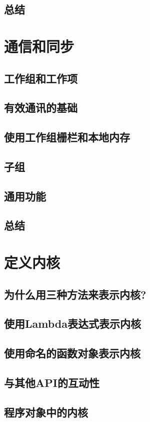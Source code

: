 \documentclass[11pt,a4paper,UTF8]{ctexart}
\begin{document}
		\subsection{总结}
	\section{通信和同步}
		\subsection{工作组和工作项}
		\subsection{有效通讯的基础}
		\subsection{使用工作组栅栏和本地内存}
		\subsection{子组}
		\subsection{通用功能}
		\subsection{总结}
	\section{定义内核}
		\subsection{为什么用三种方法来表示内核?}
		\subsection{使用Lambda表达式表示内核}
		\subsection{使用命名的函数对象表示内核}
		\subsection{与其他API的互动性}
		\subsection{程序对象中的内核}
\end{document}
